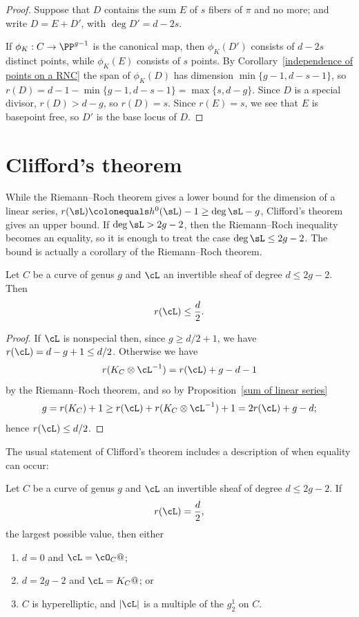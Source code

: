 \begin{proof}
Suppose that $D$ contains the sum $E$ of $s$ fibers of $\pi$ and no more; and write $D = E+D'$, with $\deg D' = d-2s$.
 
If $\phi_K:C \to \PP^{g-1}$ is the canonical map, then $\phi_K(D')$ consists of $d-2s$ distinct points, while $\phi_K(E)$ consists of
$s$ points. By Corollary~\ref{independence of points on a RNC} the span of $\phi_K(D)$ has dimension $\min\{g-1, d-s-1\}$, so 
$r(D) = d-1-\min\{g-1, d-s-1\} = \max \{s,d-g\}$. Since $D$ is a special divisor, $r(D) > d-g$, so $r(D) = s$. 
Since $r(E) =s$, we see that $E$ is basepoint free, so $D'$ is the base locus of $D$.
\end{proof}

\section{Clifford's theorem}\label{Clifford Section}

While the Riemann--Roch theorem gives a lower bound for the dimension of a linear series, $r(\sL) \colonequals h^0(\sL)-1 \geq \deg \sL -g$, Clifford's theorem
%
gives an upper bound. If $\deg \sL>2g-2$, then the Riemann--Roch
inequality becomes an equality, so it is enough to treat the case
$\deg \sL \leq 2g-2$. The bound is actually a corollary of the 
Riemann--Roch theorem.

\begin{corollary}\label{Clifford bound}
 Let $C$ be a curve of genus $g$ and $\cL$ an invertible sheaf of degree $d \leq 2g-2$. Then
$$
r(\cL) \leq \frac{d}{2}.
$$
\end{corollary}

\begin{proof}
If $\cL$ is nonspecial then, since $g\geq d/2 + 1$, we have $r(\cL) = d-g+1\leq d/2$.
Otherwise we have
$$
r(K_C\otimes \cL^{-1}) = r(\cL) +g - d - 1
$$
by the Riemann--Roch theorem,
and so by Proposition~\ref{sum of linear series}
$$
g = r(K_C)+1  \geq r(\cL) + r(K_C\otimes \cL^{-1}) +1  = 2r(\cL) +g - d;
$$
hence $r(\cL) \leq d/2$.
\end{proof}

The usual statement of Clifford's theorem includes a description of when equality can occur:

\begin{theorem}\label{Clifford}\label{Clifford equality}
Let $C$ be a curve of genus $g$ and $\cL$ an invertible sheaf of degree $d \leq 2g-2$. If
$$
r(\cL) = \frac{d}{2},
$$
the largest possible value, then either
\begin{enumerate}
\item $d=0$ and $\cL = \cO_C@$;
\item $d = 2g-2$ and $\cL = K_C@$; or
\item $C$ is hyperelliptic, and $|\cL|$ is a multiple of the $g^1_2$ on $C$.
\unif
\end{enumerate}
\end{theorem}

